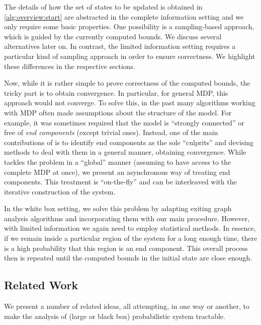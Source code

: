 \documentclass{theoretics}
\begin{document}
The details of how the set of states to be updated is obtained in \cref{alg:overview:start} are abstracted in the complete information setting and we only require some basic properties.
One possibility is a sampling-based approach, which is guided by the currently computed bounds.
We discuss several alternatives later on.
In contrast, the limited information setting requires a particular kind of sampling approach in order to ensure correctness.
We highlight these differences in the respective sections.

Now, while it is rather simple to prove correctness of the computed bounds, the tricky part is to obtain convergence.
In particular, for general MDP, this approach would not converge.
To solve this, in the past many algorithms working with MDP often made assumptions about the structure of the model.
For example, it was sometimes required that the model is \enquote{strongly connected} or free of \emph{end components} \cite{de1997formal} (except trivial ones).
Instead, one of the main contributions of \cite{DBLP:conf/rp/HaddadM14,DBLP:conf/atva/BrazdilCCFKKPU14} is to identify end components as the sole \enquote{culprits} and devising methods to deal with them in a general manner, obtaining convergence.
While \cite{DBLP:conf/rp/HaddadM14} tackles the problem in a \enquote{global} manner (assuming to have access to the complete MDP at once), we present an asynchronous way of treating end components.
This treatment is \enquote{on-the-fly} and can be interleaved with the iterative construction of the system. 

In the white box setting, we solve this problem by adapting exiting graph analysis algorithms and incorporating them with our main procedure.
However, with limited information we again need to employ statistical methods.
In essence, if we remain inside a particular region of the system for a long enough time, there is a high probability that this region is an end component.
This overall process then is repeated until the computed bounds in the initial state are close enough.

\subsection{Related Work}
We present a number of related ideas, all attempting, in one way or another, to make the analysis of (large or black box) probabilistic system tractable.
\end{document}
